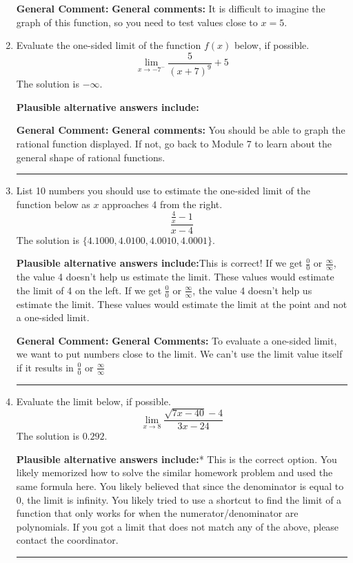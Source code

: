 \documentclass{extbook}[14pt]
\newcommand{\litem}[1]{\item #1

\rule{\textwidth}{0.4pt}}
\begin{document}
\begin{enumerate}
{\textbf{General Comment:} \textbf{General comments:} It is difficult to imagine the graph of this function, so you need to test values close to $x = 5$.
}
\litem{
Evaluate the one-sided limit of the function $f(x)$ below, if possible.
\[ \lim_{x \rightarrow -7^-} \frac{5}{(x+7)^9}+5 \]The solution is \( -\infty \).\begin{enumerate}[label=\Alph*.]
\textbf{Plausible alternative answers include:}




\end{enumerate}

\textbf{General Comment:} \textbf{General comments:} You should be able to graph the rational function displayed. If not, go back to Module 7 to learn about the general shape of rational functions.
}
\litem{
List 10 numbers you should use to estimate the one-sided limit of the function below as $x$ approaches 4 from the right.
\[ \frac{\frac{4}{x} - 1}{x - 4} \]The solution is \( \{ 4.1000, 4.0100, 4.0010, 4.0001 \} \).\begin{enumerate}[label=\Alph*.]
\textbf{Plausible alternative answers include:}This is correct!
If we get $\frac{0}{0}$ or $\frac{\infty}{\infty}$, the value 4 doesn't help us estimate the limit.
These values would estimate the limit of 4 on the left.
If we get $\frac{0}{0}$ or $\frac{\infty}{\infty}$, the value 4 doesn't help us estimate the limit.
These values would estimate the limit at the point and not a one-sided limit.
\end{enumerate}

\textbf{General Comment:} \textbf{General Comments:} To evaluate a one-sided limit, we want to put numbers close to the limit. We can't use the limit value itself if it results in $\frac{0}{0}$ or $\frac{\infty}{\infty}$
}
\litem{
Evaluate the limit below, if possible.
\[ \lim_{x \rightarrow 8} \frac{\sqrt{7x - 40} - 4}{3x - 24} \]The solution is \( 0.292 \).\begin{enumerate}[label=\Alph*.]
\textbf{Plausible alternative answers include:}* This is the correct option.
You likely memorized how to solve the similar homework problem and used the same formula here.
You likely believed that since the denominator is equal to 0, the limit is infinity.
You likely tried to use a shortcut to find the limit of a function that only works for when the numerator/denominator are polynomials.
If you got a limit that does not match any of the above, please contact the coordinator.
\end{enumerate}

}
\end{enumerate}
\end{document}
